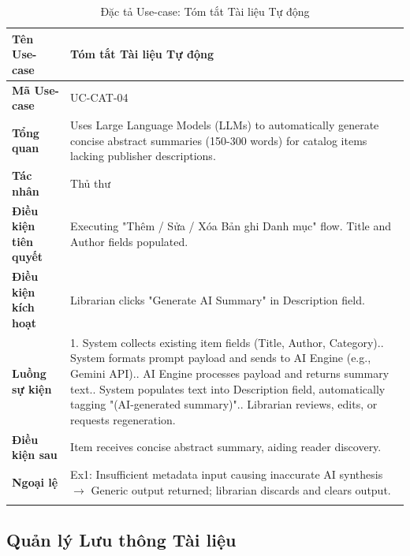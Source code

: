 \newpage
\begin{longtable}{|p{3.5cm}|p{11.5cm}|}
    \hline
    \textbf{Tên Use-case} & \textbf{Tóm tắt Tài liệu Tự động} \\
    \hline
    \textbf{Mã Use-case} & UC-CAT-04 \\
    \hline
    \textbf{Tổng quan} & Uses Large Language Models (LLMs) to automatically generate concise abstract summaries (150-300 words) for catalog items lacking publisher descriptions. \\
    \hline
    \textbf{Tác nhân} & Thủ thư \\
    \hline
    \textbf{Điều kiện tiên quyết} & Executing "Thêm / Sửa / Xóa Bản ghi Danh mục" flow. Title and Author fields populated. \\
    \hline
    \textbf{Điều kiện kích hoạt} & Librarian clicks "Generate AI Summary" in Description field. \\
    \hline
    \textbf{Luồng sự kiện} & 
    1. System collects existing item fields (Title, Author, Category).\newline
    2. System formats prompt payload and sends to AI Engine (e.g., Gemini API).\newline
    3. AI Engine processes payload and returns summary text.\newline
    4. System populates text into Description field, automatically tagging "(AI-generated summary)".\newline
    5. Librarian reviews, edits, or requests regeneration. \\
    \hline
    \textbf{Điều kiện sau} & Item receives concise abstract summary, aiding reader discovery. \\
    \hline
    \textbf{Ngoại lệ} & 
    Ex1: Insufficient metadata input causing inaccurate AI synthesis $\rightarrow$ Generic output returned; librarian discards and clears output. \\
    \hline
    \caption{Đặc tả Use-case: Tóm tắt Tài liệu Tự động}
\end{longtable}

\subsection{Quản lý Lưu thông Tài liệu}

